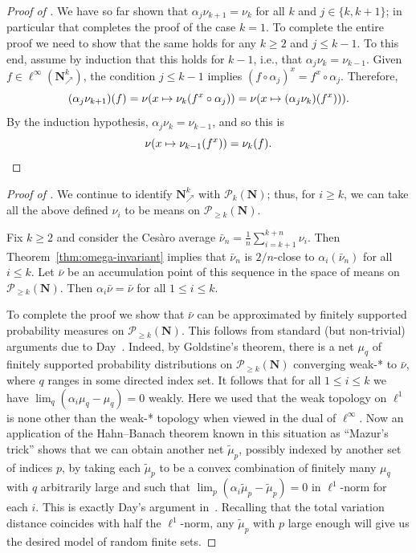 \documentclass[12pt, pdflatex]{amsart}
\theoremstyle{definition}
\numberwithin{equation}{section}
\numberwithin{theorem}{section}
\newcommand{\NN}{\mathbf{N}}
\newcommand{\sP}{\mathscr{P}}
\newcommand{\incr}{\NN_\nearrow}
\begin{document}
\begin{proof}[Proof of ]
We have so far shown that $\alpha_j\nu_{k+1}=\nu_k$ for all $k$ and $j \in \{k,k+1\}$; in particular that completes the proof of the case $k=1$. To complete the entire proof we need to show that the same holds for any $k \geq 2$ and $j \leq k-1$. To this end, assume by induction that this holds for $k-1$, i.e., that $\alpha_{j}\nu_{k}=\nu_{k-1}$. Given $f\in\ell^\infty( \incr^k)$, the condition $j\leq k-1$ implies $(f\circ \alpha_j) ^x = f^x \circ \alpha_j$. Therefore,
\begin{equation*}
(\alpha_j \nu_{k+1})(f)   = \nu \mleft( x \mapsto \nu_{k} \mleft(  f^x\circ \alpha_{j} \mright) \mright)  = \nu \mleft( x \mapsto (\alpha_{j} \nu_{k}) \mleft(  f^x )\mright) \mright).
\end{equation*}
By the induction hypothesis, $\alpha_j\nu_k = \nu_{k-1}$, and so this is
\begin{equation*}
\nu \mleft( x \mapsto \nu_{k-1} \mleft(  f^x\mright) \mright) = \nu_k(f).
\end{equation*}
\end{proof}

\begin{proof}[Proof of ]
We continue to identify $\incr^k$ with $\sP_k(\NN)$; thus, for $i\geq k$, we can take all the above defined $\nu_i$ to be means on $\sP_{\geq k}(\NN)$. 

Fix $k \geq 2$ and consider the Ces{\`a}ro average $\bar \nu_n = \frac{1}{n}\sum_{i=k+1}^{k+n}\nu_i$. Then Theorem~\ref{thm:omega-invariant} implies that $\bar\nu_n$  is $2/n$-close to $\alpha_i(\bar\nu_n)$ for all $i \leq k$. Let $\bar\nu$ be an accumulation point of this sequence in the space of means on $\sP_{\geq k}(\NN)$. Then $\alpha_i \bar\nu = \bar\nu$ for all $1\leq i \leq k$.

To complete the proof we show that $\bar\nu$ can be approximated by finitely supported probability measures on $\sP_{\geq k}(\NN)$. This follows from standard (but non-trivial) arguments due to Day~\cites{Day57}. Indeed, by Goldstine's theorem, there is a net $\mu_q$ of finitely supported probability distributions on  $\sP_{\geq k}(\NN)$ converging weak-* to $\bar\nu$, where $q$ ranges in some directed index set. It follows that for all $1\leq i \leq k$ we have $\lim_q (\alpha_i \mu_q - \mu_q)=0$ weakly. Here we used that the weak topology on $\ell^1$ is none other than the weak-* topology when viewed in the dual of $\ell^\infty$. Now an application of the Hahn--Banach theorem known in this situation as ``Mazur's trick'' shows that we can obtain another net $\widetilde\mu_p$, possibly indexed by another set of indices $p$, by taking each $\widetilde\mu_p$ to be a convex combination of finitely many  $\mu_q$ with $q$ arbitrarily large and such that $\lim_p (\alpha_i \widetilde\mu_p - \widetilde\mu_p)=0$ in $\ell^1$-norm for each $i$. This is exactly Day's argument in~\cite[\S5]{Day57}. Recalling that the total variation distance coincides with half the $\ell^1$-norm, any $\widetilde\mu_p$ with $p$ large enough will give us the desired model of random finite sets.
\end{proof}
\end{document}
